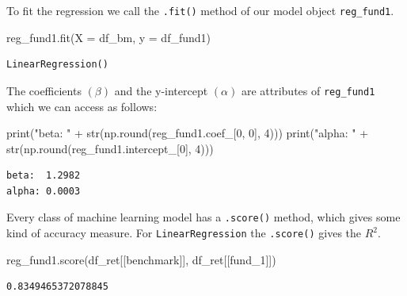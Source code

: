 \documentclass[
  letterpaper,
  DIV=11,
  numbers=noendperiod]{scrreprt}
\newenvironment{Shaded}{\begin{snugshade}}{\end{snugshade}}
\newcommand{\BuiltInTok}[1]{\textcolor[rgb]{0.00,0.23,0.31}{#1}}
\newcommand{\DecValTok}[1]{\textcolor[rgb]{0.68,0.00,0.00}{#1}}
\newcommand{\NormalTok}[1]{\textcolor[rgb]{0.00,0.23,0.31}{#1}}
\newcommand{\OperatorTok}[1]{\textcolor[rgb]{0.37,0.37,0.37}{#1}}
\newcommand{\StringTok}[1]{\textcolor[rgb]{0.13,0.47,0.30}{#1}}
\begin{document}
To fit the regression we call the \texttt{.fit()} method of our model
object \texttt{reg\_fund1}.

\begin{Shaded}
\begin{Highlighting}[]
\NormalTok{reg\_fund1.fit(X }\OperatorTok{=}\NormalTok{ df\_bm, y }\OperatorTok{=}\NormalTok{ df\_fund1)}
\end{Highlighting}
\end{Shaded}

\begin{verbatim}
LinearRegression()
\end{verbatim}

The coefficients \((\beta)\) and the y-intercept \((\alpha)\) are
attributes of \texttt{reg\_fund1} which we can access as follows:

\begin{Shaded}
\begin{Highlighting}[]
\BuiltInTok{print}\NormalTok{(}\StringTok{"beta:  "} \OperatorTok{+} \BuiltInTok{str}\NormalTok{(np.}\BuiltInTok{round}\NormalTok{(reg\_fund1.coef\_[}\DecValTok{0}\NormalTok{, }\DecValTok{0}\NormalTok{], }\DecValTok{4}\NormalTok{)))}
\BuiltInTok{print}\NormalTok{(}\StringTok{"alpha: "} \OperatorTok{+} \BuiltInTok{str}\NormalTok{(np.}\BuiltInTok{round}\NormalTok{(reg\_fund1.intercept\_[}\DecValTok{0}\NormalTok{], }\DecValTok{4}\NormalTok{)))}
\end{Highlighting}
\end{Shaded}

\begin{verbatim}
beta:  1.2982
alpha: 0.0003
\end{verbatim}

Every class of machine learning model has a \texttt{.score()} method,
which gives some kind of accuracy measure. For \texttt{LinearRegression}
the \texttt{.score()} gives the \(R^2\).

\begin{Shaded}
\begin{Highlighting}[]
\NormalTok{reg\_fund1.score(df\_ret[[}\StringTok{\textquotesingle{}benchmark\textquotesingle{}}\NormalTok{]], df\_ret[[}\StringTok{\textquotesingle{}fund\_1\textquotesingle{}}\NormalTok{]])}
\end{Highlighting}
\end{Shaded}

\begin{verbatim}
0.8349465372078845
\end{verbatim}
\end{document}

